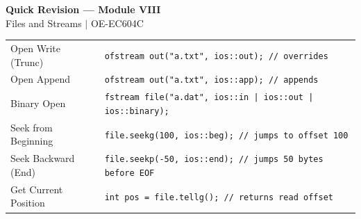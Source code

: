 \documentclass[12pt,a4paper]{article}
\renewcommand{\arraystretch}{1.45}
\begin{document}
\newpage
\begin{center}
  {\large\bfseries\color{myred} Quick Revision --- Module VIII}\\[3pt]
  {\small\color{mydark} Files and Streams $|$ OE-EC604C}
\end{center}
\noindent{\color{myred}\rule{\linewidth}{1.2pt}}
\vspace{4pt}

\begin{tcolorbox}[formulabox, title={\textbf{Key File I/O Syntax}}]
\renewcommand{\arraystretch}{1.3}
\begin{tabularx}{\linewidth}{B{3.8cm} X}
Open Write (Trunc)       & \texttt{ofstream out("a.txt", ios::out); // overrides} \\[4pt]
Open Append              & \texttt{ofstream out("a.txt", ios::app); // appends} \\[4pt]
Binary Open              & \texttt{fstream file("a.dat", ios::in | ios::out | ios::binary);} \\[4pt]
Seek from Beginning      & \texttt{file.seekg(100, ios::beg); // jumps to offset 100} \\[4pt]
Seek Backward (End)      & \texttt{file.seekp(-50, ios::end); // jumps 50 bytes before EOF} \\[4pt]
Get Current Position     & \texttt{int pos = file.tellg(); // returns read offset}
\end{tabularx}
\end{tcolorbox}
\end{document}
